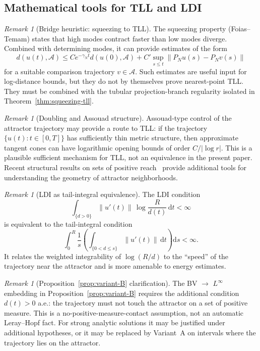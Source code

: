 \documentclass[12pt,a4paper]{article}
\theoremstyle{definition}
\theoremstyle{plain}
\theoremstyle{remark}
\newtheorem{remark}[definition]{Remark}
\begin{document}
\subsection{Mathematical tools for TLL and LDI}

\begin{remark}[Bridge heuristic: squeezing to TLL]
\label{rem:bridge-squeezing}
The squeezing property (Foias--Temam) states that high modes contract faster than low modes diverge. Combined with determining modes, it can provide estimates of the form
\[
  d(u(t),\mathcal{A})
  \le C e^{-\gamma_N t}d(u(0),\mathcal{A})
      + C'\sup_{s\le t}\|P_N u(s)-P_N v(s)\|
\]
for a suitable comparison trajectory $v\in\mathcal{A}$.  Such estimates
are useful input for log-distance bounds, but they do not by themselves
prove nearest-point TLL.  They must be combined with the tubular
projection-branch regularity isolated in Theorem~\ref{thm:squeezing-tll}.
\end{remark}

\begin{remark}[Doubling and Assouad structure]
\label{rem:doubling-assouad}
Assouad-type control of the attractor trajectory may provide a route
to TLL: if the trajectory $\{u(t):t\in[0,T]\}$ has sufficiently thin
metric structure, then approximate tangent cones can have logarithmic
opening bounds of order $C/|\log r|$.  This is a plausible sufficient
mechanism for TLL, not an equivalence in the present paper.  Recent
structural results on sets of positive reach~\cite{Lytchak2024} provide
additional tools for understanding the geometry of attractor
neighborhoods.
\end{remark}

\begin{remark}[LDI as tail-integral equivalence]
\label{rem:ldi-tail}
The LDI condition
\[
  \int_{\{d>0\}} \|u'(t)\|\,\log\frac{R}{d(t)}\,\mathrm{d}t < \infty
\]
is equivalent to the tail-integral condition
\[
  \int_0^R \frac{1}{s}
  \left(
    \int_{\{0 < d \leq s\}} \|u'(t)\|\,\mathrm{d}t
  \right)\mathrm{d}s < \infty.
\]
It relates the weighted integrability of $\log(R/d)$ to the ``speed'' of
the trajectory near the attractor and is more amenable to energy estimates.
\end{remark}

\begin{remark}[Proposition~\ref{prop:variant-B} clarification]
\label{rem:prop-variant-B-clarification}
The BV $\to$ $L^\infty$ embedding in Proposition~\ref{prop:variant-B} requires the additional condition $d(t) > 0$ a.e.: the trajectory must not touch the attractor on a set of positive measure.  This is a no-positive-measure-contact assumption, not an automatic Leray--Hopf fact.  For strong analytic solutions it may be justified under additional hypotheses, or it may be replaced by Variant~A on intervals where the trajectory lies on the attractor.
\end{remark}
\end{document}
